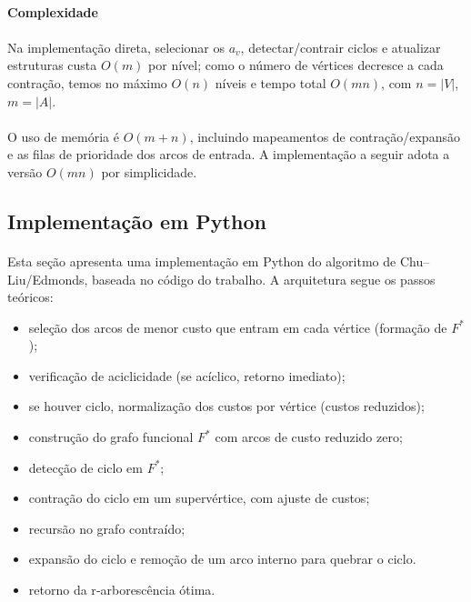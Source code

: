 \documentclass[12pt,a4paper]{article}
\begin{document}
\paragraph{Complexidade}
\paragraph{}
Na implementação direta, selecionar os \(a_v\), detectar/contrair ciclos e atualizar estruturas custa \(O(m)\) por nível; como o número de vértices decresce a cada contração, temos no máximo \(O(n)\) níveis e tempo total \(O(mn)\), com \(n=|V|\), \(m=|A|\).


\paragraph{}
O uso de memória é \(O(m+n)\), incluindo mapeamentos de contração/expansão e as filas de prioridade dos arcos de entrada. A implementação a seguir adota a versão \(O(mn)\) por simplicidade.

\subsection{Implementação em Python}

\paragraph{}
Esta seção apresenta uma implementação em Python do algoritmo de Chu–Liu/Edmonds, baseada no código do trabalho. A arquitetura segue os passos teóricos:

\begin{itemize}\setlength{\itemsep}{2pt}
    \item seleção dos arcos de menor custo que entram em cada vértice (formação de \(F^*\));
    \item verificação de aciclicidade (se acíclico, retorno imediato);
    \item se houver ciclo, normalização dos custos por vértice (custos reduzidos);
    \item construção do grafo funcional \(F^*\) com arcos de custo reduzido zero;
    \item detecção de ciclo em \(F^*\);
    \item contração do ciclo em um supervértice, com ajuste de custos;
    \item recursão no grafo contraído;
    \item expansão do ciclo e remoção de um arco interno para quebrar o ciclo.
    \item retorno da r‑arborescência ótima.
\end{itemize}
\end{document}
